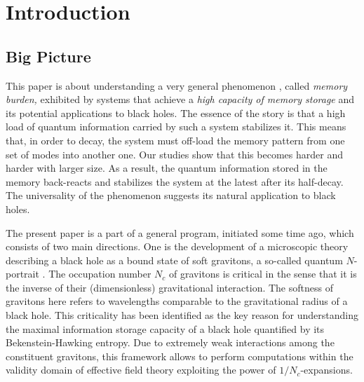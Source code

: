 \documentclass[aps,prd,reprint,superscriptaddress,nofootinbib]{revtex4-2}
\begin{document}
\maketitle


\tableofcontents


\section{Introduction}

\subsection{Big Picture}
This paper is about understanding a very general
phenomenon \cite{1810.02336, 1812.08749}, called {\it memory burden,} exhibited by systems that achieve a  {\it high capacity of memory storage} and its potential applications 
to black holes. The essence of the story is that 
a high load of quantum information carried by such a system   
stabilizes it. This means that, in order to decay, the system must off-load 
the memory pattern from one set of modes into another one. Our studies 
show that this becomes harder and harder with larger size. As a result,  
the quantum information stored in the memory back-reacts and stabilizes the system at the latest after 
its half-decay. The universality of the phenomenon 
suggests its natural application to black holes. 

The present paper is a part of a general program, initiated some time 
ago, which consists of two main directions. 
One is the development of a microscopic theory describing a black hole 
as a bound state of soft gravitons, a so-called quantum $N$-portrait
\cite{1112.3359}.  The occupation number $N_c$  of gravitons is 
critical in the sense that it is the inverse of their (dimensionless) gravitational interaction.
The softness of gravitons here refers to wavelengths 
comparable to the gravitational radius of a black hole.  This criticality
has been identified \cite{1207.4059} as the key reason for understanding the maximal information storage capacity of a black hole
quantified by its Bekenstein-Hawking entropy. 
Due to extremely weak interactions among the constituent gravitons, this framework allows to perform
computations within the validity domain of effective field theory
exploiting the power of $1/N_c$-expansions.  
\end{document}
